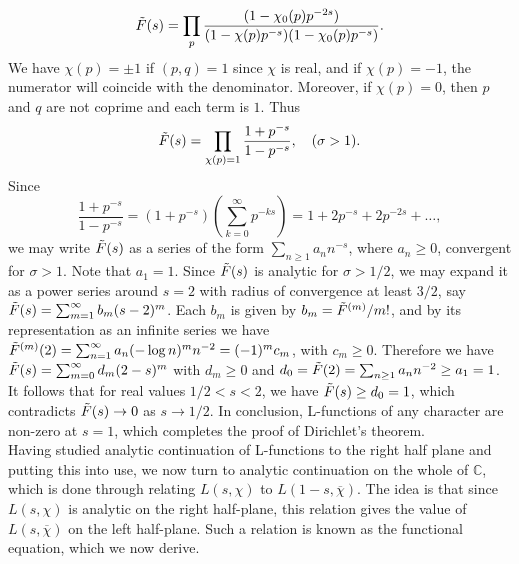 \begin{equation}
    \Tilde{F}(s) = \prod_{p} \frac{(1 - \chi_{0}(p)p^{-2s})}{(1 - \chi(p)p^{-s})(1 - \chi_{0}(p)p^{-s})}. \nonumber
\end{equation}
We have $\chi(p) = \pm 1$ if $(p, q) = 1$ since $\chi$ is real, and if $\chi(p) = -1$, the numerator will coincide with the denominator. Moreover, if $\chi(p) = 0$, then $p$ and $q$ are not coprime and each term is $1$. Thus
\begin{equation}
    \Tilde{F}(s) = \prod_{\substack{\chi(p) = 1}} \frac{1 + p^{-s}}{1 - p^{-s}}, \quad (\sigma > 1). \nonumber
\end{equation}
Since
\begin{equation}
    \frac{1 + p^{-s}}{1 - p^{-s}} = (1 + p^{-s})\left( \sum_{k=0}^{\infty} p^{-ks} \right) = 1 + 2p^{-s} + 2p^{-2s} + \dots, \nonumber
\end{equation}
we may write $\Tilde{F}(s)$ as a series of the form $\sum_{n \geq 1} a_n n^{-s}$, where $a_n \geq 0$, convergent for $\sigma > 1$. Note that $a_1 = 1$. Since $\Tilde{F}(s)$ is analytic for $\sigma > 1/2$, we may expand it as a power series around $s = 2$ with radius of convergence at least $3/2$, say $\Tilde{F}(s) = \sum_{m=1}^{\infty} b_m (s - 2)^{m}$. Each $b_m$ is given by $b_m = \Tilde{F}^{(m)}/m!$, and by its representation as an infinite series we have $\Tilde{F}^{(m)}(2) = \sum_{n=1}^{\infty} a_n (-\log n)^{m} n^{-2} = (-1)^{m} c_m$, with $c_m \geq 0$. Therefore we have $\Tilde{F}(s) = \sum_{m=0}^{\infty}d_m (2 - s)^{m}$ with $d_m \geq 0$ and $d_0 = \Tilde{F}(2) = \sum_{n \geq 1} a_n n^{-2} \geq a_1 = 1$. It follows that for real values $1/2 < s < 2$, we have $\Tilde{F}(s) \geq d_0 = 1$, which contradicts $\Tilde{F}(s) \rightarrow 0$ as $s \rightarrow 1/2$. In conclusion, L-functions of any character are non-zero at $s = 1$, which completes the proof of Dirichlet's theorem. \\

Having studied analytic continuation of L-functions to the right half plane and putting this into use, we now turn to analytic continuation on the whole of $\mathbb{C}$, which is done through relating $L(s, \chi)$ to $L(1-s, \overline{\chi})$. The idea is that since $L(s, \chi)$ is analytic on the right half-plane, this relation gives the value of $L(s, \overline{\chi})$ on the left half-plane. Such a relation is known as the functional equation, which we now derive.